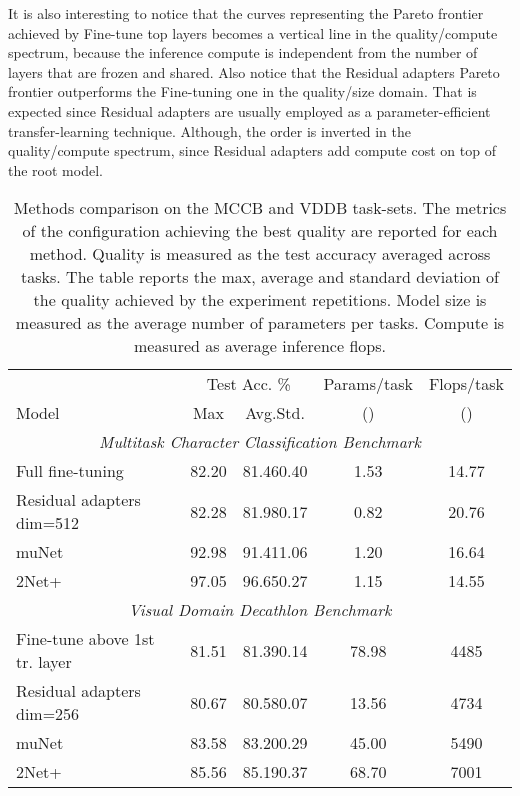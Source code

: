 \documentclass{article} \usepackage{iclr2023_conference,times}
\begin{document}
It is also interesting to notice that the curves representing the Pareto frontier achieved by Fine-tune top layers becomes a vertical line in the quality/compute spectrum, because the inference compute is independent from the number of layers that are frozen and shared.
Also notice that the Residual adapters Pareto frontier outperforms the Fine-tuning one in the quality/size domain.
That is expected since Residual adapters are usually employed as a parameter-efficient transfer-learning technique. 
Although, the order is inverted in the quality/compute spectrum, since Residual adapters add compute cost on top of the root model.


\begin{table*}[t]
\begin{center}
\caption{
Methods comparison on the MCCB and VDDB task-sets.
The metrics of the configuration achieving the best quality are reported for each method.
Quality is measured as the test accuracy averaged across tasks.
The table reports the max, average and standard deviation of the quality achieved by the experiment repetitions.
Model size is measured as the average number of parameters per tasks. Compute is measured as average inference flops.
}
\label{table:bestmetrics}
\begin{tabular}{lcccc}
\toprule
 & \multicolumn{2}{c}{Test Acc. \%} & Params/task & Flops/task\\
                     Model &    Max &   Avg.Std. & () & () \\
\midrule
\multicolumn{5}{c}{\emph{Multitask Character Classification Benchmark}} \\
Full fine-tuning &  82.20 &  81.460.40 &                1.53 &  14.77 \\
 Residual adapters dim=512 &  82.28 &  81.980.17 &                0.82 &  20.76 \\
                     muNet &  92.98 &  91.411.06 &                1.20 &  16.64 \\
                2Net+ &  97.05 &  96.650.27 &                1.15 &  14.55 \\


\midrule
\multicolumn{5}{c}{\emph{Visual Domain Decathlon Benchmark}} \\
Fine-tune above 1st tr. layer &  81.51 &  81.390.14 &               78.98 &  4485\\
Residual adapters dim=256 &  80.67 &  80.580.07 &               13.56 &  4734\\
                     muNet &  83.58 &  83.200.29 &               45.00 &  5490\\
                2Net+ &  85.56 &  85.190.37 &               68.70 &  7001\\
\bottomrule
\end{tabular}

\end{center}
\end{table*}
\end{document}
